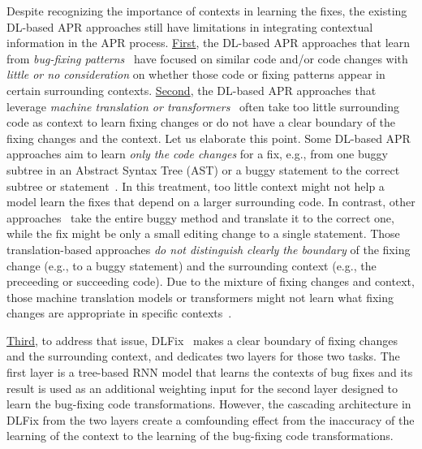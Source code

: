 Despite recognizing the importance of contexts in learning the fixes,
the existing DL-based APR approaches still have limitations in
integrating contextual information in the APR
process. \underline{First}, the DL-based APR approaches that learn
from {\em bug-fixing patterns}~\cite{white2016deep,gupta2017deepfix}
have focused on similar code and/or code changes with {\em little or
  no consideration} on whether those code or fixing patterns appear in
certain surrounding contexts. \underline{Second}, the DL-based APR
approaches that leverage {\em machine translation or
  transformers}~\cite{chakrabortycodit,chen2018sequencer,hata2018learning,tufano2018empirical,see2017get}
often take too little surrounding code as context to learn fixing
changes or do not have a clear boundary of the fixing changes and the
context. Let us elaborate this point. Some DL-based APR approaches aim
to learn {\em only the code changes} for a fix, e.g., from one buggy
subtree in an Abstract Syntax Tree (AST) or a buggy statement to the
correct subtree or statement~\cite{chakrabortycodit}. In this
treatment, too little context might not help a model learn the fixes
that depend on a larger surrounding code. In contrast, other
approaches~\cite{chen2018sequencer,hata2018learning} take the entire
buggy method and translate it to the correct one, while the fix might
be only a small editing change to a single statement. Those
translation-based approaches {\em do not distinguish clearly the
  boundary} of the fixing change (e.g., to a buggy statement) and the
surrounding context (e.g., the preceeding or succeeding code). Due to
the mixture of fixing changes and context, those machine translation
models or transformers might not learn what fixing changes are
appropriate in specific contexts~\cite{icse20}.

\underline{Third}, to address that issue, DLFix~\cite{icse20} makes a
clear boundary of fixing changes and the surrounding context, and
dedicates two layers for those two tasks. The first layer is a
tree-based RNN model that learns the contexts of bug fixes and its
result is used as an additional weighting input for the second layer
designed to learn the bug-fixing code transformations. However, the
cascading architecture in DLFix from the two layers create a
comfounding effect from the inaccuracy of the learning of the context
to the learning of the bug-fixing code transformations.

